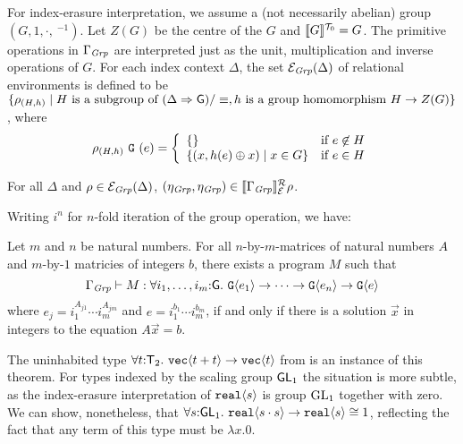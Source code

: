 For index-erasure interpretation, we assume a (not necessarily
abelian) group $(G, 1, \cdot, \ ^{-1})$. Let $Z(G)$ be the centre of
the $G$ %
and $\llbracket G \rrbracket^{\mathcal{T}_0} = G$. The primitive operations
in $\Gamma_{\mathit{Grp}}$ are interpreted just as the unit, multiplication and
inverse operations of $G$. For each index context $\Delta$, the set
$\mathcal{E}_{\mathit{Grp}}(\Delta)$ of relational environments is defined to be
$\{ \rho_{(H,h)} \mathrel| H\textrm{ is a subgroup of }(\Delta
\Rightarrow \mathsf{G})/\equiv, h\textrm{ is a group homomorphism }H
\to Z(G) \}$, where
\begin{displaymath}
  \rho_{(H,h)}\ \tyPrimNm{G}\ (e) = \left\{
    \begin{array}{ll}
      \{ \} & \textrm{if}\ e\not\in H \\
      \{ (x, h(e)\oplus x) \sepbar x \in G \} & \textrm{if}\ e\in H
    \end{array}
  \right.
\end{displaymath}

\begin{lemma}
  For all $\Delta$ and $\rho \in \mathcal{E}_{\mathit{Grp}}(\Delta)$,
  $(\eta_{\mathit{Grp}},\eta_{\mathit{Grp}}) \in \llbracket \Gamma_{\mathit{Grp}} \rrbracket^{\mathcal{R}}_{\mathcal{E}}{\rho}$.
\end{lemma}

Writing $i^n$ for $n$-fold iteration of the group operation, we have:
\begin{theorem}
  Let $m$ and $n$ be natural numbers. For all $n$-by-$m$-matrices of
  natural numbers $A$ and $m$-by-$1$ matricies of integers $b$,
  there exists a program $M$ such that
  \begin{equation}
    \label{eq:fo-group-type}
    \Gamma_\Grp \vdash M : \forall i_1,\dots,i_m\mathord:\mathsf{G}.\ \tyPrim{G}{e_1} \to \dots \to \tyPrim{G}{e_n} \to \tyPrim{G}{e}
  \end{equation}
  where $e_j = i_1^{A_{j1}}\cdots i_m^{A_{jm}}$ and $e = i_1^{b_1}\cdots i_m^{b_m}$, if and only if there is a solution $\vec{x}$
  in integers to the equation $A \vec x = b$.
\end{theorem}
The uninhabited type  $\forall t \mathord:
  \mathsf{T}_2.\ \textup{\texttt{vec}}\langle t + t \rangle \to \textup{\texttt{vec}}\langle t \rangle$
from  is an instance of this theorem.
For types indexed by the scaling group $\mathsf{GL}_1$ the situation is more subtle, as
the index-erasure interpretation of $\textup{\texttt{real}}\langle s \rangle$ is group $\mathrm{GL}_1$ together with zero.
We can show, nonetheless, that $\forall s \mathord:
  \mathsf{GL}_1.\ \textup{\texttt{real}}\langle s \cdot s \rangle \to \textup{\texttt{real}}\langle s \rangle\cong 1$, reflecting 
the fact that any term of this type must be $\lambda x.0$.

